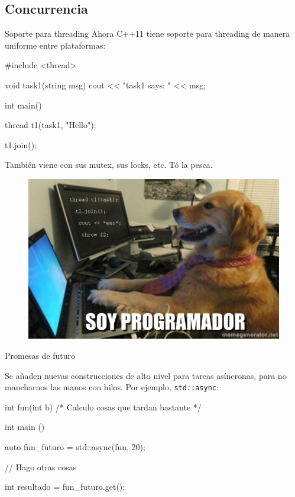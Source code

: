 \documentclass[8pt,xcolor=svgnames]{beamer}
\begin{document}
\subsection{Concurrencia}

\begin{frame}[fragile]{Soporte para threading}
  Ahora C++11 tiene soporte para threading de manera uniforme entre plataformas:

  \begin{cppcode}
#include <thread>

void task1(string msg) {
    cout << "task1 says: " << msg;
}

int main(){
    thread t1(task1, "Hello");

    t1.join();
}    
  \end{cppcode}

También viene con sus mutex, sus locks, etc. Tó la pesca.
  
\end{frame}

\begin{frame}
  \begin{figure}[c!]
    \centering
    \includegraphics[width=\textwidth]{img_dog_throw.jpg}
  \end{figure}
\end{frame}

\begin{frame}[fragile]{Promesas de futuro}

  Se añaden nuevas construcciones de alto nivel para tareas asíncronas, para no
  mancharnos las manos con hilos. Por ejemplo, \texttt{std::async}:

  \begin{cppcode}
 int fun(int b) { /* Calculo cosas que tardan bastante */ }

 int main () {
     auto fun_futuro = std::async(fun, 20);

     // Hago otras cosas

     int resultado = fun_futuro.get();
 }

   \end{cppcode}

\end{frame}
\end{document}
